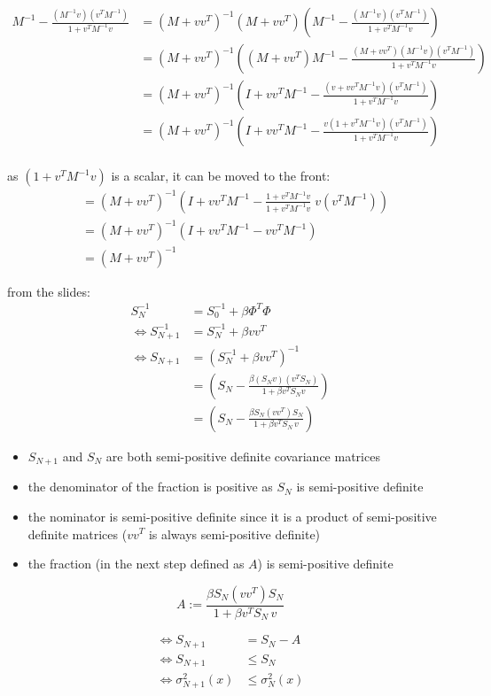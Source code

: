 \begin{align*}
 M^{-1} - \frac{\left(M^{-1}v\right)\left(v^T M^{-1}\right)}{1 + v^T M^{-1} v}
    &= \left(M + vv^T\right)^{-1} \left(M + vv^T\right) \left(M^{-1} - \frac{\left(M^{-1}v\right)\left(v^T M^{-1}\right)}{1 + v^T M^{-1} v}\right) \\
    &= \left(M + vv^T\right)^{-1} \left(\left(M + vv^T\right)M^{-1} - \frac{\left(M + vv^T\right)\left(M^{-1}v\right)\left(v^T M^{-1}\right)}{1 + v^T M^{-1} v}\right) \\
    &= \left(M + vv^T\right)^{-1} \left(I + vv^TM^{-1} - \frac{\left(v + vv^T M^{-1} v\right)\left(v^T M^{-1}\right)}{1 + v^T M^{-1} v}\right) \\
    &= \left(M + vv^T\right)^{-1} \left(I + vv^TM^{-1} - \frac{v\left(1 + v^T M^{-1} v\right)\left(v^T M^{-1}\right)}{1 + v^T M^{-1} v}\right) \\
\end{align*}

as $(1 + v^T M^{-1} v)$ is a scalar, it can be moved to the front:
\begin{align*}
    &= \left(M + vv^T\right)^{-1} \left(I + vv^TM^{-1} - \frac{1 + v^T M^{-1} v}{1 + v^T M^{-1} v} \; v \left(v^T M^{-1}\right)\right) \\
    &= \left(M + vv^T\right)^{-1} \left(I + vv^T M^{-1} - vv^T M^{-1}\right) \\
    &= \left(M + vv^T\right)^{-1}
\end{align*}

from the slides:
\begin{align*}
	S_N^{-1} &= S_0^{-1} + \beta \Phi^T \Phi \\
	\Leftrightarrow S_{N+1}^{-1} &= S_N^{-1} + \beta v v^T \\
	\Leftrightarrow S_{N+1} &= (S_N^{-1} + \beta v v^T)^{-1} \\
				&= (S_N - \frac{\beta (S_N v)(v^T S_N)}{1 + \beta v^T S_N v}) \\
	&= (S_N - \frac{\beta S_N (v v^T) S_N}{1 + \beta v^T S_N \, v})
\end{align*}

\begin{itemize}
\item{$S_{N+1}$ and $S_N$ are both semi-positive definite covariance matrices}
\item{the denominator of the fraction is positive as $S_N$ is semi-positive definite}
\item{the nominator is semi-positive definite since it is a product of semi-positive definite matrices ($vv^T$ is always semi-positive definite)}
\item{the fraction (in the next step defined as $A$) is semi-positive definite}
\end{itemize}

\[ A := \frac{\beta S_N (v v^T) S_N}{1 + \beta v^T S_N \, v} \]

\begin{align*}
	\Leftrightarrow S_{N+1} &= S_N - A \\
	\Leftrightarrow S_{N+1} &\le S_N \\
	\Leftrightarrow \sigma_{N+1}^2(x) &\le \sigma_N^2(x)
\end{align*}

